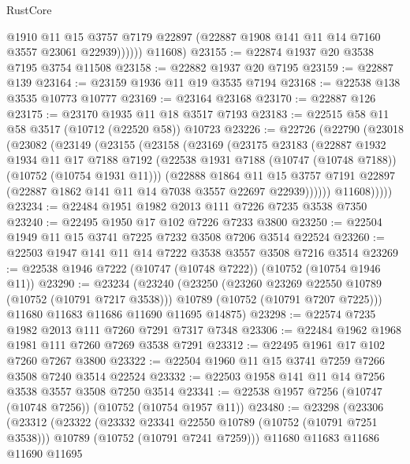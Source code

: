 \begin{lexlean}{RustCore}
\begin{coremodule}
                @1910
                @11
                @15
                @3757
                @7179
                @22897
                (@22887 @1908 @141 @11 @14 @7160 @3557 @23061 @22939))))))
      @11608)
@23155 := @22874 @1937 @20 @3538 @7195 @3754 @11508
@23158 := @22882 @1937 @20 @7195
@23159 := @22887 @139
@23164 := @23159 @1936 @11 @19 @3535 @7194
@23168 := @22538 @138 @3535 @10773 @10777
@23169 := @23164 @23168
@23170 := @22887 @126
@23175 := @23170 @1935 @11 @18 @3517 @7193
@23183 := @22515 @58 @11 @58 @3517 (@10712 (@22520 @58)) @10723
@23226 := @22726
    (@22790
      (@23018
        (@23082
          (@23149
            (@23155
              (@23158
                (@23169
                  (@23175
                    @23183
                    (@22887
                      @1932
                      @1934
                      @11
                      @17
                      @7188
                      @7192
                      (@22538 @1931 @7188 (@10747 (@10748 @7188)) (@10752 (@10754 @1931 @11)))
                      (@22888
                        @1864
                        @11
                        @15
                        @3757
                        @7191
                        @22897
                        (@22887 @1862 @141 @11 @14 @7038 @3557 @22697 @22939))))))
              @11608)))))
@23234 := @22484 @1951 @1982 @2013 @111 @7226 @7235 @3538 @7350
@23240 := @22495 @1950 @17 @102 @7226 @7233 @3800
@23250 := @22504 @1949 @11 @15 @3741 @7225 @7232 @3508 @7206 @3514 @22524
@23260 := @22503 @1947 @141 @11 @14 @7222 @3538 @3557 @3508 @7216 @3514
@23269 := @22538 @1946 @7222 (@10747 (@10748 @7222)) (@10752 (@10754 @1946 @11))
@23290 := @23234
    (@23240
      (@23250
        (@23260 @23269 @22550 @10789 (@10752 (@10791 @7217 @3538)))
        @10789
        (@10752 (@10791 @7207 @7225)))
      @11680
      @11683
      @11686
      @11690
      @11695
      @14875)
@23298 := @22574 @7235 @1982 @2013 @111 @7260 @7291 @7317 @7348
@23306 := @22484 @1962 @1968 @1981 @111 @7260 @7269 @3538 @7291
@23312 := @22495 @1961 @17 @102 @7260 @7267 @3800
@23322 := @22504 @1960 @11 @15 @3741 @7259 @7266 @3508 @7240 @3514 @22524
@23332 := @22503 @1958 @141 @11 @14 @7256 @3538 @3557 @3508 @7250 @3514
@23341 := @22538 @1957 @7256 (@10747 (@10748 @7256)) (@10752 (@10754 @1957 @11))
@23480 := @23298
    (@23306
      (@23312
        (@23322
          (@23332 @23341 @22550 @10789 (@10752 (@10791 @7251 @3538)))
          @10789
          (@10752 (@10791 @7241 @7259)))
        @11680
        @11683
        @11686
        @11690
        @11695

\end{coremodule}
\end{lexlean}
